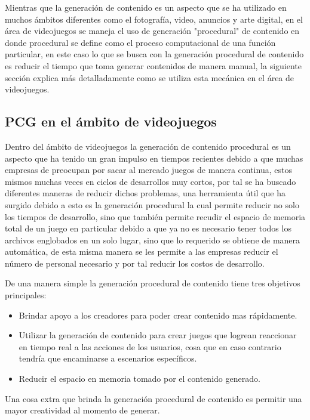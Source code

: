 Mientras que la generación de contenido es un aspecto que se ha utilizado en
muchos ámbitos diferentes como el fotografía, video, anuncios y arte digital, en
el área de videojuegos se maneja el uso de generación "procedural" de contenido
en donde procedural se define como el proceso computacional de una función
particular, en este caso lo que se busca con la generación procedural de
contenido es reducir el tiempo que toma generar contenidos de manera manual, la
siguiente sección explica más detalladamente como se utiliza esta mecánica en el
área de videojuegos.

\subsection{PCG en el ámbito de videojuegos}
\label{subsection:PCGInGames}

Dentro del ámbito de videojuegos la generación de contenido procedural es un
aspecto que ha tenido un gran impulso en tiempos recientes debido a que muchas
empresas de preocupan por sacar al mercado juegos de manera continua, estos
mismos muchas veces en ciclos de desarrollos muy cortos, por tal se ha buscado
diferentes maneras de reducir dichos problemas, una herramienta útil que ha
surgido debido a esto es la generación procedural la cual permite reducir no
solo los tiempos de desarrollo, sino que también permite recudir el espacio de
memoria total de un juego en particular debido a que ya no es necesario tener
todos los archivos englobados en un solo lugar, sino que lo requerido se obtiene
de manera automática, de esta misma manera se les permite a las empresas reducir
el número de personal necesario y por tal reducir los costos de desarrollo.

De una manera simple la generación procedural de contenido tiene tres objetivos
principales:
\begin{itemize}
    \item Brindar apoyo a los creadores para poder crear contenido mas
    rápidamente.
    \item Utilizar la generación de contenido para crear juegos que logrean
    reaccionar en tiempo real a las acciones de los usuarios, cosa que en caso
    contrario tendría que encaminarse a escenarios específicos.
    \item Reducir el espacio en memoria tomado por el contenido generado.
\end{itemize}
Una cosa extra que brinda la generación procedural de contenido es permitir una
mayor creatividad al momento de generar.

